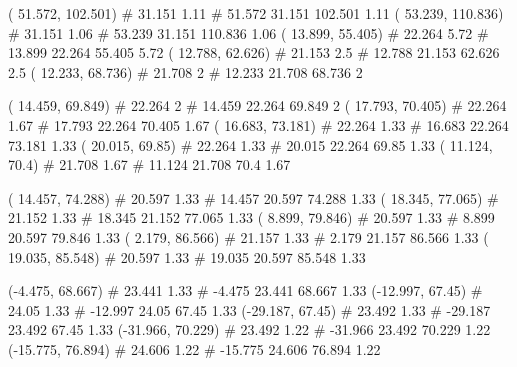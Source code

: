 \documentclass[a4paper,openbib,10pt]{article}
\newenvironment{treegraph}{\begin{graph}}{\end{graph}}
\begin{document}
\begin{treegraph}
  ( 51.572, 102.501) #     31.151    1.11
   #    51.572    31.151    102.501    1.11
  ( 53.239, 110.836) #     31.151    1.06
   #    53.239    31.151    110.836    1.06
  ( 13.899, 55.405) #     22.264    5.72
   #    13.899    22.264    55.405    5.72
  ( 12.788, 62.626) #     21.153    2.5
   #    12.788    21.153    62.626    2.5
  ( 12.233, 68.736) #     21.708    2
   #    12.233    21.708    68.736    2

  ( 14.459, 69.849) #     22.264    2
   #    14.459    22.264    69.849    2
  ( 17.793, 70.405) #     22.264    1.67
   #    17.793    22.264    70.405    1.67
  ( 16.683, 73.181) #     22.264    1.33
   #    16.683    22.264    73.181    1.33
  ( 20.015, 69.85) #     22.264    1.33
   #    20.015    22.264    69.85    1.33
  ( 11.124, 70.4) #     21.708    1.67
   #    11.124    21.708    70.4    1.67

  ( 14.457, 74.288) #     20.597    1.33
   #    14.457    20.597    74.288    1.33
  ( 18.345, 77.065) #     21.152    1.33
   #    18.345    21.152    77.065    1.33
  ( 8.899, 79.846) #     20.597    1.33
   #    8.899    20.597    79.846    1.33
  ( 2.179, 86.566) #     21.157    1.33
   #    2.179    21.157    86.566    1.33
  ( 19.035, 85.548) #     20.597    1.33
   #    19.035    20.597    85.548    1.33

  (-4.475, 68.667) #     23.441    1.33
   #    -4.475    23.441    68.667    1.33
  (-12.997, 67.45) #     24.05    1.33
   #    -12.997    24.05    67.45    1.33
  (-29.187, 67.45) #     23.492    1.33
   #    -29.187    23.492    67.45    1.33
  (-31.966, 70.229) #     23.492    1.22
   #    -31.966    23.492    70.229    1.22
  (-15.775, 76.894) #     24.606    1.22
   #    -15.775    24.606    76.894    1.22


\end{treegraph}
\end{document}
